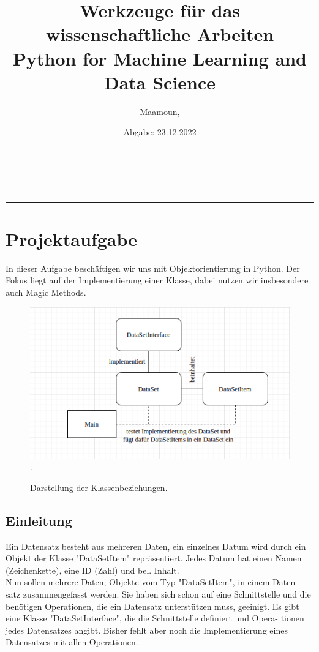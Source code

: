 \documentclass{article}
\title{Werkzeuge für das wissenschaftliche Arbeiten \\[0.1cm]  {\large Python for Machine Learning and Data Science} }
\author{ {\large Maamoun, } }
\date{Abgabe: 23.12.2022}
\begin{document}
	
	\maketitle
\hrule\hfill\\	
	
	\tableofcontents
\hrule

	

\section{Projektaufgabe}
	In dieser Aufgabe beschäftigen wir uns mit Objektorientierung in Python. Der
	Fokus liegt auf der Implementierung einer Klasse, dabei nutzen wir insbesondere
	auch Magic Methods.
\begin{figure}[H]
		\begin{minipage}{\linewidth}
			\renewcommand{\footnoterule}{}
			\begin{center}
				\includegraphics[width=0.77\linewidth]{bild.png}.
			\end{center}
			\caption[Darstellung der Klassenbeziehungen] {Darstellung der Klassenbeziehungen.}
		\end{minipage}
\end{figure}
\subsection{Einleitung}
Ein Datensatz besteht aus mehreren Daten, ein einzelnes Datum wird durch ein
Objekt der Klasse "DataSetItem" repräsentiert. Jedes Datum hat einen Namen
(Zeichenkette), eine ID (Zahl) und bel. Inhalt.\\[0.25cm]

Nun sollen mehrere Daten, Objekte vom Typ "DataSetItem", in einem Daten-
satz zusammengefasst werden. Sie haben sich schon auf eine Schnittstelle und
die benötigen Operationen, die ein Datensatz unterstützen muss, geeinigt. Es
gibt eine Klasse "DataSetInterface", die die Schnittstelle definiert und Opera-
tionen jedes Datensatzes angibt. Bisher fehlt aber noch die Implementierung
eines Datensatzes mit allen Operationen.\\[0.25cm]
\end{document}

